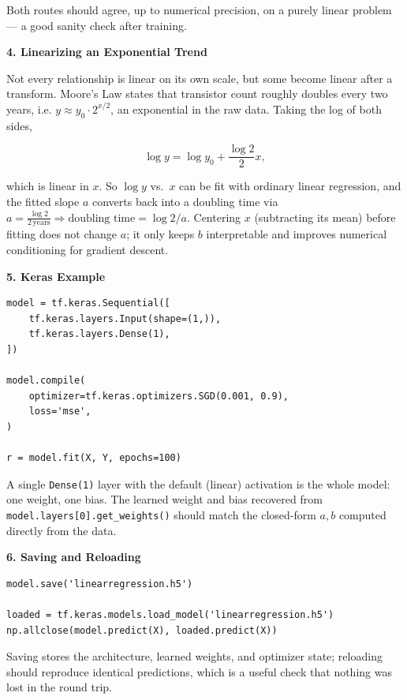 \documentclass[conference]{IEEEtran}
\begin{document}
Both routes should agree, up to numerical precision, on a purely linear
problem --- a good sanity check after training.

\bigskip

\textbf{4. Linearizing an Exponential Trend}

Not every relationship is linear on its own scale, but some become
linear after a transform. Moore's Law states that transistor count
roughly doubles every two years, i.e. $y \approx y_0 \cdot 2^{x/2}$, an
exponential in the raw data. Taking the log of both sides,

\[
  \log y = \log y_0 + \frac{\log 2}{2} x,
\]

which is linear in $x$. So $\log y$ vs.\ $x$ can be fit with ordinary
linear regression, and the fitted slope $a$ converts back into a
doubling time via $a = \tfrac{\log 2}{2\,\text{years}} \Rightarrow
\text{doubling time} = \log 2 / a$. Centering $x$ (subtracting its mean)
before fitting does not change $a$; it only keeps $b$ interpretable and
improves numerical conditioning for gradient descent.

\bigskip

\textbf{5. Keras Example}

\begin{verbatim}
model = tf.keras.Sequential([
    tf.keras.layers.Input(shape=(1,)),
    tf.keras.layers.Dense(1),
])

model.compile(
    optimizer=tf.keras.optimizers.SGD(0.001, 0.9),
    loss='mse',
)

r = model.fit(X, Y, epochs=100)
\end{verbatim}

A single \texttt{Dense(1)} layer with the default (linear) activation is
the whole model: one weight, one bias. The learned weight and bias
recovered from \texttt{model.layers[0].get\_weights()} should match the
closed-form $a,b$ computed directly from the data.

\bigskip

\textbf{6. Saving and Reloading}

\begin{verbatim}
model.save('linearregression.h5')

loaded = tf.keras.models.load_model('linearregression.h5')
np.allclose(model.predict(X), loaded.predict(X))
\end{verbatim}

Saving stores the architecture, learned weights, and optimizer state;
reloading should reproduce identical predictions, which is a useful
check that nothing was lost in the round trip.
\end{document}
